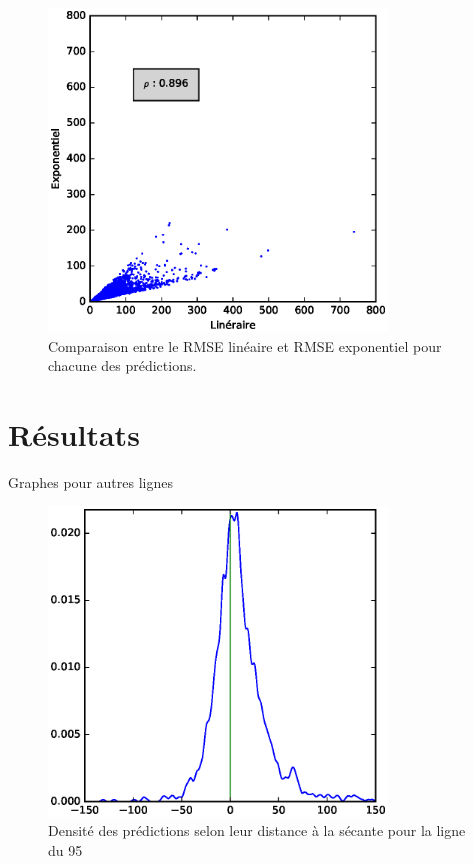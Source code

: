\documentclass[letterpaper]{article}
\begin{document}
\begin{appendices}
\begin{figure}[h]
   \centerline{\includegraphics[width=9cm]{metrics-lin-exp.eps}}
   \caption{\label{fig:metrics-ann2}Comparaison entre le RMSE linéaire et RMSE exponentiel pour chacune des prédictions.}
\end{figure}

\section{Résultats}

Graphes pour autres lignes

\begin{figure}[h]
   \centerline{\includegraphics[width=9cm]{density.eps}}
   \caption{\label{fig:density} Densité des prédictions selon leur distance à la sécante pour la ligne du 95}
\end{figure}


\end{appendices}
\end{document}
